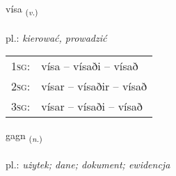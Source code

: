 \documentclass[frontgrid, backgrid]{flacards}\usepackage[]{graphicx}\usepackage[]{xcolor}
\begin{document}
\renewcommand{\flhead}{\vskip5pt \fboxsep=0pt {\small\bfseries\footnotesize Sagnorð | Verb}}
\renewcommand{\fcfoot}{\vskip5pt \fboxsep=0pt \hspace{2pt}{\small\bfseries\footnotesize 1K}}

\renewcommand{\blhead}{\vskip5pt {\small\bfseries\footnotesize Sagnorð | Verb }}
\renewcommand{\bcfoot}{\vskip5pt \hspace{2pt}{\small\bfseries\footnotesize 1K}}


{vísa \small{\textsubscript{(\textit{v.})}} \\[1ex] %
\textphonetic{[viːsa]} \\
pl.: \emph{kierować, prowadzić} \\  [2ex]
\renewcommand*{\arraystretch}{0.8}
\begin{tabular}{p{1cm}l}
\textsc{1sg}: & vísa -- vísaði -- vísað \\ 
\textsc{2sg}: & vísar -- vísaðir -- vísað \\ 
\textsc{3sg}: & vísar -- vísaði -- vísað \\ 
\end{tabular}
}

\renewcommand{\flhead}{\vskip5pt \fboxsep=0pt {\small\bfseries\footnotesize Nafnorð | Noun}}
\renewcommand{\fcfoot}{\vskip5pt \fboxsep=0pt \hspace{2pt}{\small\bfseries\footnotesize 1K}}

\renewcommand{\blhead}{\vskip5pt {\small\bfseries\footnotesize Nafnorð | Noun }}
\renewcommand{\bcfoot}{\vskip5pt \hspace{2pt}{\small\bfseries\footnotesize 1K}}


{gagn \small{\textsubscript{(\textit{n.})}} \\[1ex] %
\textphonetic{[kakn̥]} \\
pl.: \emph{użytek; dane; dokument; ewidencja} \\  [2ex]
\renewcommand*{\arraystretch}{0.8}
}
\end{document}
